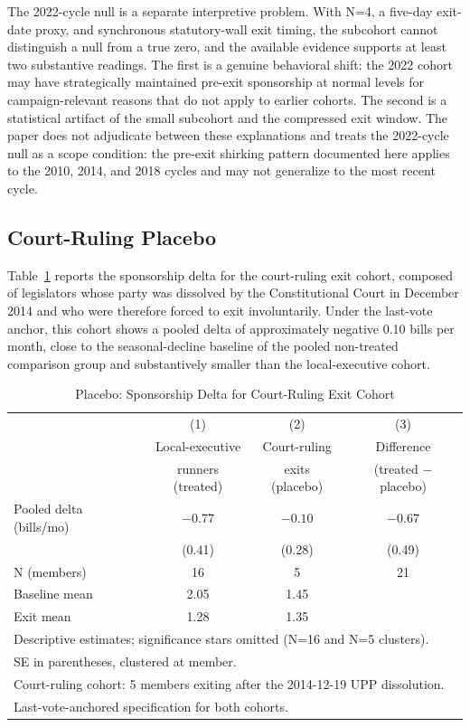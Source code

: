 \documentclass[11pt]{article}
\begin{document}
The 2022-cycle null is a separate interpretive problem. With N=4, a five-day exit-date proxy, and synchronous statutory-wall exit timing, the subcohort cannot distinguish a null from a true zero, and the available evidence supports at least two substantive readings. The first is a genuine behavioral shift: the 2022 cohort may have strategically maintained pre-exit sponsorship at normal levels for campaign-relevant reasons that do not apply to earlier cohorts. The second is a statistical artifact of the small subcohort and the compressed exit window. The paper does not adjudicate between these explanations and treats the 2022-cycle null as a scope condition: the pre-exit shirking pattern documented here applies to the 2010, 2014, and 2018 cycles and may not generalize to the most recent cycle.

\subsection{Court-Ruling Placebo}

Table~\ref{tab:placebo} reports the sponsorship delta for the court-ruling exit cohort, composed of legislators whose party was dissolved by the Constitutional Court in December 2014 and who were therefore forced to exit involuntarily. Under the last-vote anchor, this cohort shows a pooled delta of approximately negative 0.10 bills per month, close to the seasonal-decline baseline of the pooled non-treated comparison group and substantively smaller than the local-executive cohort.

\begin{table}[H]
\centering
\caption{Placebo: Sponsorship Delta for Court-Ruling Exit Cohort}
\label{tab:placebo}
\begin{tabular}{lccc}
\toprule
 & (1) & (2) & (3) \\
 & Local-executive & Court-ruling & Difference \\
 & runners (treated) & exits (placebo) & (treated $-$ placebo) \\
\midrule
Pooled delta (bills/mo) & $-0.77$ & $-0.10$ & $-0.67$ \\
 & (0.41) & (0.28) & (0.49) \\
N (members) & 16 & 5 & 21 \\
Baseline mean & 2.05 & 1.45 & \\
Exit mean & 1.28 & 1.35 & \\
\bottomrule
\multicolumn{4}{l}{\footnotesize Descriptive estimates; significance stars omitted (N=16 and N=5 clusters).} \\
\multicolumn{4}{l}{\footnotesize SE in parentheses, clustered at member.} \\
\multicolumn{4}{l}{\footnotesize Court-ruling cohort: 5 members exiting after the 2014-12-19 UPP dissolution.} \\
\multicolumn{4}{l}{\footnotesize Last-vote-anchored specification for both cohorts.} \\
\end{tabular}
\end{table}
\end{document}
